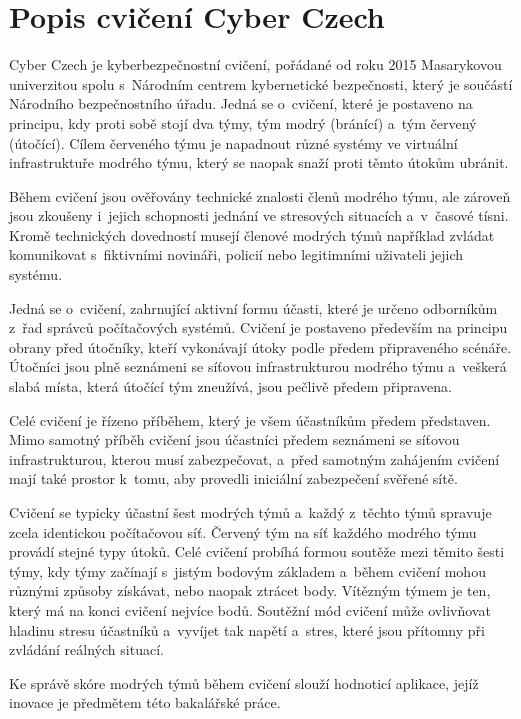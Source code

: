 \documentclass[
  digital,
  twoside,
  table, 
  nolof, 
  nolot
]{fithesis3}
\begin{document}
\section{Popis cvičení Cyber Czech}

Cyber Czech je kyberbezpečnostní cvičení, pořádané od roku 2015 Masarykovou univerzitou spolu s~Národním centrem kybernetické bezpečnosti, který je součástí Národního bezpečnostního úřadu. Jedná se o~cvičení, které je postaveno na principu, kdy proti sobě stojí dva týmy, tým modrý (bránící) a~tým červený (útočící). Cílem červeného týmu je napadnout různé systémy ve virtuální infrastruktuře modrého týmu, který se naopak snaží proti těmto útokům ubránit.

Během cvičení jsou ověřovány technické znalosti členů modrého týmu, ale zároveň jsou zkoušeny i~jejich schopnosti jednání ve stresových situacích a~v~časové tísni. Kromě technických dovedností musejí členové modrých týmů například zvládat komunikovat s~fiktivními novináři, policií nebo legitimními uživateli jejich systému.

Jedná se o~cvičení, zahrnující aktivní formu účasti, které je určeno odborníkům z~řad správců počítačových systémů. Cvičení je postaveno především na principu obrany před útočníky, kteří vykonávají útoky podle předem připraveného scénáře. Útočníci jsou plně seznámeni se síťovou infrastrukturou modrého týmu a~veškerá slabá místa, která útočící tým zneužívá, jsou pečlivě předem připravena.

Celé cvičení je řízeno příběhem, který je všem účastníkům předem představen. Mimo samotný příběh cvičení jsou účastníci předem seznámeni se síťovou infrastrukturou, kterou musí zabezpečovat, a~před samotným zahájením cvičení mají také prostor k~tomu, aby provedli iniciální zabezpečení svěřené sítě.

Cvičení se typicky účastní šest modrých týmů a~každý z~těchto týmů spravuje zcela identickou počítačovou síť. Červený tým na síť každého modrého týmu provádí stejné typy útoků. Celé cvičení probíhá formou soutěže mezi těmito šesti týmy, kdy týmy začínají s~jistým bodovým základem a~během cvičení mohou různými způsoby získávat, nebo naopak ztrácet body. Vítězným týmem je ten, který má na konci cvičení nejvíce bodů. Soutěžní mód cvičení může ovlivňovat hladinu stresu účastníků a~vyvíjet tak napětí a~stres, které jsou přítomny při zvládání reálných situací.

Ke správě skóre modrých týmů během cvičení slouží hodnoticí aplikace, jejíž inovace je předmětem této bakalářské práce. 
\end{document}
